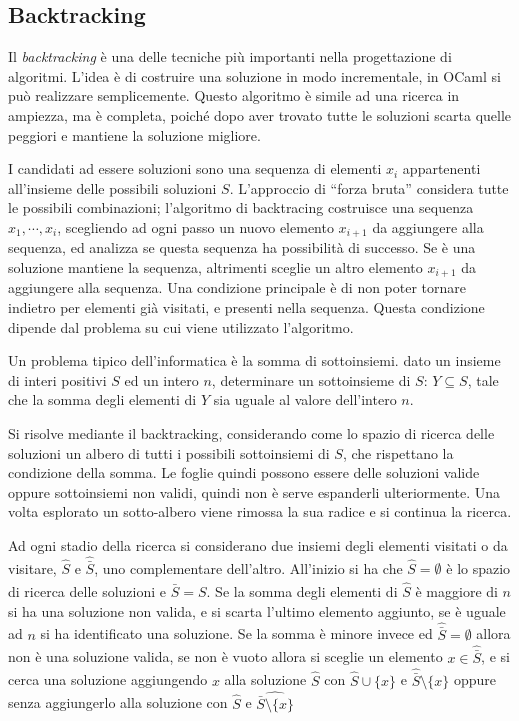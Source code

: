 \documentclass{article}
\numberwithin{equation}{subsection}
\begin{document}
\subsection{Backtracking}

Il \textit{backtracking} è una delle tecniche più importanti nella progettazione di algoritmi. L'idea è di costruire una soluzione in modo incrementale, in OCaml si può realizzare semplicemente. Questo algoritmo è simile ad una ricerca in ampiezza, ma è completa, poiché dopo aver trovato tutte le soluzioni scarta quelle peggiori e mantiene la soluzione migliore. 

I candidati ad essere soluzioni sono una sequenza di elementi $x_i$ appartenenti all'insieme delle possibili soluzioni $S$. L'approccio di ``forza bruta'' considera tutte le possibili combinazioni; l'algoritmo di backtracing costruisce una sequenza $x_1,\cdots,x_i$, scegliendo ad ogni passo un nuovo elemento $x_{i+1}$ da aggiungere alla sequenza, ed analizza se questa sequenza ha possibilità di successo. Se è una soluzione mantiene la sequenza, altrimenti sceglie un altro elemento $x_{i+1}$ da aggiungere alla sequenza. 
Una condizione principale è di non poter tornare indietro per elementi già visitati, e presenti nella sequenza. Questa condizione dipende dal problema su cui viene utilizzato l'algoritmo. 


Un problema tipico dell'informatica è la somma di sottoinsiemi. dato un insieme di interi positivi $S$ ed un intero $n$, determinare un sottoinsieme di $S$: $Y\subseteq S$, tale che la somma degli elementi di $Y$ sia uguale al valore dell'intero $n$. 

Si risolve mediante il backtracking, considerando come lo spazio di ricerca delle soluzioni un albero di tutti i possibili sottoinsiemi di $S$, che rispettano la condizione della somma. Le foglie quindi possono essere delle soluzioni valide oppure sottoinsiemi non validi, quindi non è serve espanderli ulteriormente. Una volta esplorato un sotto-albero viene rimossa la sua radice e si continua la ricerca. 


Ad ogni stadio della ricerca si considerano due insiemi degli elementi visitati o da visitare, $\hat{S}$ e $\hat{\bar{S}}$, uno complementare dell'altro. All'inizio si ha che $\hat{S}=\emptyset$ è lo spazio di ricerca delle soluzioni e $\hat{\bar{S}}=S$. 
Se la somma degli elementi di $\hat{S}$ è maggiore di $n$ si ha una soluzione non valida, e si scarta l'ultimo elemento aggiunto, se è uguale ad $n$ si ha identificato una soluzione. Se la somma è minore invece ed $\hat{\bar{S}}=\emptyset$ allora non è una soluzione valida, se non è vuoto allora si sceglie un elemento $x\in\hat{\bar{S}}$, e si cerca una soluzione aggiungendo $x$ alla soluzione $\hat{S}$ con $\hat{S}\cup\{x\}$ e $\hat{\bar{S}}\setminus\{x\}$ oppure senza aggiungerlo alla soluzione con $\hat{S}$ e $\hat{\bar{S}\setminus\{x\}}$ 
\end{document}
